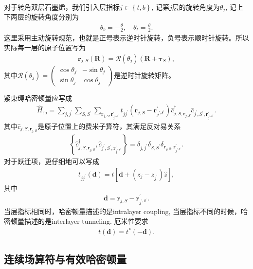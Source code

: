 \documentclass[10pt, oneside]{article}
\begin{document}
对于转角双层石墨烯，我们引入层指标\(j \in \left\{t,b\right\}\), 记第\(j\)层的旋转角度为\(\theta_{j}\), 记上下两层的旋转角度分别为
\begin{align}
	\theta_{b} = - \frac{\theta}{2}, \quad \theta_{t} = \frac{\theta}{2}.
\end{align}
这里采用主动旋转规范，也就是正号表示逆时针旋转，负号表示顺时针旋转。所以实际每一层的原子位置写为
\begin{align}
	\boxed{
		\bm{r}_{j,S} \left(\bm{R}\right) = \mathcal{R} \left(\theta_{j}\right) \left(\bm{R} + \bm{\tau}_{S}\right),
	}
\end{align}
其中\(\mathcal{R} \left(\theta_{j}\right) = \begin{pmatrix}
	\cos \theta_{j} & - \sin \theta_{j} \\ \sin  \theta_{j}  & \cos  \theta_{j} 
\end{pmatrix}\)是逆时针旋转矩阵。

紧束缚哈密顿量应写成
\begin{align}
	\hat{H}_{\mathrm{tb}} = \sum_{j,j^{\prime}} \sum_{S,S^{\prime}} \sum_{\bm{r}_{j,S},\bm{r}^{\prime}_{j^{\prime, S^{\prime}}}} t_{j j^{\prime}} \left(\bm{r}_{j,S} -\bm{r}^{\prime}_{j^{\prime, S^{\prime}}} \right) \hat{c}^{\dagger}_{j,S,\bm{r}_{j,S} } \hat{c}_{j^{\prime}, S^{\prime}, \bm{r}^{\prime}_{j^{\prime, S^{\prime}}} }.
\end{align}
其中\( \hat{c}_{j,S,\bm{r}_{j,S} }\)是原子位置上的费米子算符，其满足反对易关系
\begin{align}
	\left\{ \hat{c}^{\dagger}_{j,S,\bm{r}_{j,S} }, \hat{c}_{j^{\prime}, S^{\prime}, \bm{r}^{\prime}_{j^{\prime, S^{\prime}}} } \right\} = \delta_{j,j^{\prime}} \delta_{S,S^{\prime}} \delta_{\bm{r}_{j,S}, \bm{r}^{\prime}_{j^{\prime, S^{\prime}}}}.
\end{align}
对于跃迁项，更仔细地可以写成
\begin{align}
	t_{jj^{\prime}} \left(\bm{d}\right) = t \left[\bm{d} + \left(z_{j} - z_{j^{\prime}}\right) \hat{z} \right],
\end{align}
其中 
\begin{align}
	\bm{d} = \bm{r}_{j,S}-  \bm{r}^{\prime}_{j^{\prime, S^{\prime}}}.
\end{align}
当层指标相同时，哈密顿量描述的是intralayer coupling, 当层指标不同的时候，哈密顿量描述的是interlayer tunneling. 厄米性要求
\begin{align}
	t \left(\bm{d}\right) = t^{*} \left(-\bm{d}\right).
\end{align}

\subsection{连续场算符与有效哈密顿量}
\end{document}
